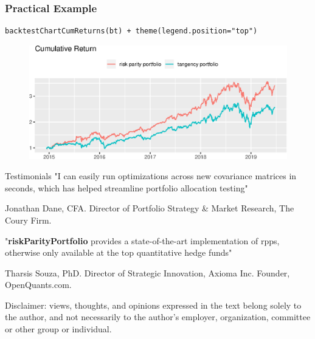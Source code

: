 \documentclass{beamer}
\begin{document}
\begin{frame}[fragile]
\frametitle{Practical Example}
\begin{verbatim}
backtestChartCumReturns(bt) + theme(legend.position="top")
\end{verbatim}
\begin{figure}[!htb]
  \centering
  \includegraphics[scale=.7]{codes/returns.eps}
\end{figure}
\end{frame}

\begin{frame}{Testimonials}
  \vspace{.5cm}
  "I can easily run optimizations across new covariance matrices in seconds, which has helped streamline portfolio allocation testing"\linebreak
  \begin{flushright}Jonathan Dane, CFA. Director of Portfolio Strategy \& Market Research, The Coury Firm.\end{flushright}

    "\textbf{riskParityPortfolio} provides a state-of-the-art
   implementation of rpps, otherwise only available at the top quantitative
   hedge funds"\linebreak
   \begin{flushright}Tharsis Souza, PhD. Director of Strategic Innovation, Axioma Inc. Founder, OpenQuants.com.\end{flushright}

   {\footnotesize Disclaimer: views, thoughts, and opinions expressed in the text belong solely to the author,
   and not necessarily to the author’s employer, organization, committee or other group or individual.}
\end{frame}
\end{document}
